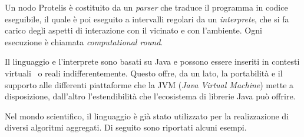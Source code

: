 Un nodo Protelis è costituito da un \emph{parser} che traduce il programma in codice eseguibile, il quale è poi eseguito a intervalli regolari da un \emph{interprete}, che si fa carico degli aspetti di interazione con il vicinato e con l'ambiente.
Ogni esecuzione è chiamata \emph{computational round}.

Il linguaggio e l'interprete sono basati su Java e possono essere inseriti in contesti virtuali~\cite{ProtelisSAC14} o reali indifferentemente.
Questo offre, da un lato, la portabilità e il supporto alle differenti piattaforme che la JVM (\emph{Java Virtual Machine}) mette a disposizione, dall'altro l'estendibilità che l'ecosistema di librerie Java può offrire.

Nel mondo scientifico, il linguaggio è già stato utilizzato per la realizzazione di diversi algoritmi aggregati.
Di seguito sono riportati alcuni esempi.


